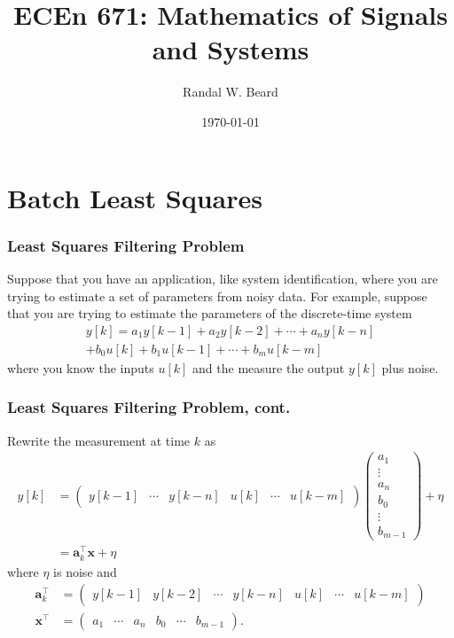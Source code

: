 \documentclass{beamer}
\title{ECEn 671: Mathematics of Signals and Systems}
\author{Randal W. Beard}
\institute{Brigham Young University}
\date{\today}
\begin{document}
\begin{frame}
	\titlepage
\end{frame}


\section{Batch Least Squares}
\frame{\sectionpage}

\begin{frame}\frametitle{Least Squares Filtering Problem}

Suppose that you have an application, like system identification, where you are trying to estimate a set of parameters from noisy data. For example, suppose that you are trying to estimate the parameters of the discrete-time system
\begin{multline*}
y[k] = a_1 y[k-1] + a_2 y[k-2] + \cdots + a_n y[k-n] \\+ b_0 u[k] + b_1 u[k-1] + \cdots + b_m u[k-m]
\end{multline*}
where you know the inputs $u[k]$ and the measure the output $y[k]$ plus noise.

\end{frame}

\begin{frame}\frametitle{Least Squares Filtering Problem, cont.}
 
Rewrite the measurement at time $k$ as
\begin{align*}
y[k] &= \begin{pmatrix} y[k-1] & \cdots & y[k-n] & u[k] & \cdots & u[k-m] \end{pmatrix} \begin{pmatrix} a_1 \\ \vdots \\ a_n \\ b_0 \\ \vdots \\ b_{m-1}\end{pmatrix} + \eta \\
 &= \mathbf{a}_k^\top \mathbf{x} + \eta
\end{align*}
where $\eta$ is noise and
\begin{align*}
\mathbf{a}_k^\top &= \begin{pmatrix} y[k-1] & y[k-2] & \cdots & y[k-n] & u[k] & \cdots & u[k-m] \end{pmatrix} \\
\mathbf{x}^\top &= \begin{pmatrix} a_1 & \cdots & a_n & b_0 & \cdots & b_{m-1}\end{pmatrix}.
\end{align*}


\end{frame}
\end{document}
